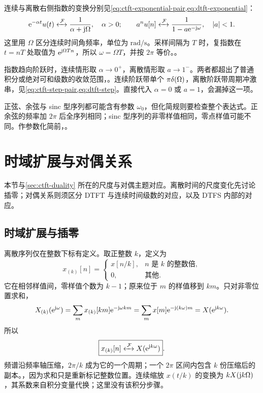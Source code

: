 连续与离散右侧指数的变换分别见\cref{eq:ctft-exponential-pair,eq:dtft-exponential}：
\[
  \mathrm{e}^{-\alpha t}u(t)\mathrel{\xleftrightarrow{\,\mathcal{F}\,}}\frac1{\alpha+\mathrm{j}\Omega},
  \quad\alpha>0;
  \qquad
  a^nu[n]\mathrel{\xleftrightarrow{\,\mathcal{F}\,}}\frac1{1-a\mathrm{e}^{-\mathrm{j}\omega}},
  \quad |a|<1.
\]
这里用 $\Omega$ 区分连续时间角频率，单位为 $\mathrm{rad/s}$。采样间隔为 $T$ 时，复指数在 $t=nT$ 处取值为 $\mathrm{e}^{\mathrm{j}\Omega Tn}$，所以 $\omega=\Omega T$，并按 $2\pi$ 等价。。

指数趋向阶跃时，连续情形取 $\alpha\to0^+$，离散情形取 $a\to1^-$。两者都超出了普通积分或绝对可和级数的收敛范围，。连续阶跃带单个 $\pi\delta(\Omega)$，离散阶跃带周期冲激串，见\cref{eq:ctft-step-pair,eq:dtft-step}。直接代入 $\alpha=0$ 或 $a=1$，会漏掉这一项。

正弦、余弦与 sinc 型序列都可能含有参数 $\omega_0$，但化简规则要检查整个表达式。正余弦的频率加 $2\pi$ 后全序列相同；sinc 型序列的非零样值相同，零点样值可能不同。作参数化简前，。

\section{时域扩展与对偶关系}
\label{sec:dtft-expansion-duality}

本节与\cref{sec:ctft-duality} 所在的尺度与对偶主题对应。离散时间的尺度变化先讨论插零；对偶关系则须区分 DTFT 与连续时间级数的对应，以及 DTFS 内部的对应。

\subsection{时域扩展与插零}
\label{sec:dtft-expansion}

离散序列仅在整数下标有定义。取正整数 $k$，定义为
\begin{equation}
  x_{(k)}[n]=
  \begin{cases}
    x[n/k],&n\text{ 是 }k\text{ 的整数倍},\\
    0,&\text{其他}.
  \end{cases}
  \label{eq:dtft-expansion-definition}
\end{equation}
它在相邻样值间，零样值个数为 $k-1$；原来位于 $m$ 的样值移到 $km$。只对非零位置求和，
\[
  X_{(k)}(\mathrm{e}^{\mathrm{j}\omega})
  =\sum_m x_{(k)}[km]\mathrm{e}^{-\mathrm{j}\omega km}
  =\sum_m x[m]\mathrm{e}^{-\mathrm{j}(k\omega)m}
  =X(\mathrm{e}^{\mathrm{j} k\omega}).
\]
所以
\begin{equation}
  \boxed{x_{(k)}[n]\mathrel{\xleftrightarrow{\,\mathcal{F}\,}} X(\mathrm{e}^{\mathrm{j} k\omega})}.
  \label{eq:dtft-expansion}
\end{equation}
频谱沿频率轴压缩，$2\pi/k$ 成为它的一个周期；一个 $2\pi$ 区间内包含 $k$ 份压缩后的副本。，因为求和只是重新标记整数位置。连续缩放 $x(t/k)$ 的变换为 $kX(\mathrm{j} k\Omega)$，其系数来自积分变量代换；这里没有该积分步骤。

